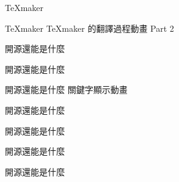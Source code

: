 \newpage
\begin{mainpage}{3}{TeXmaker}
\end{mainpage}
\newpage
\begin{mainpage}{3}{TeXmaker}
TeXmaker 的翻譯過程動畫 Part 2
\end{mainpage}
\newpage
{}
\newpage
{}
\newpage
\begin{mainpage}{4}{開源還能是什麼}
\end{mainpage}
\newpage
\begin{mainpage}{4}{開源還能是什麼}
\end{mainpage}
\newpage
\begin{mainpage}{4}{開源還能是什麼}
關鍵字顯示動畫
\end{mainpage}
\newpage
\begin{mainpage}{4}{開源還能是什麼}
\end{mainpage}
\newpage
\begin{mainpage}{4}{開源還能是什麼}
\end{mainpage}
\newpage
\begin{mainpage}{4}{開源還能是什麼}
\end{mainpage}
\newpage
\begin{mainpage}{4}{開源還能是什麼}
\end{mainpage}
\newpage
